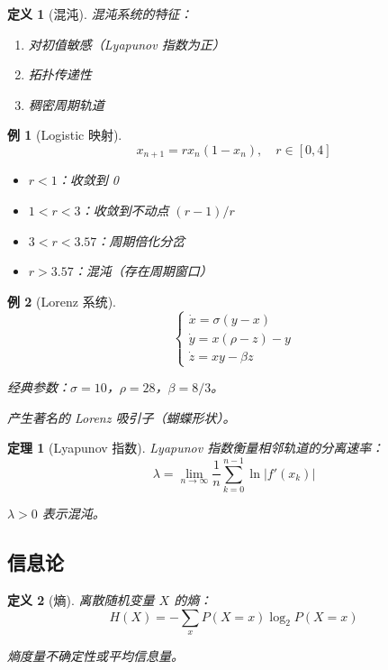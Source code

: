 \documentclass[12pt]{article}
\newtheorem{theorem}{定理}[section]
\newtheorem{definition}{定义}[section]
\newtheorem{example}{例}[section]
\begin{document}
\begin{definition}[混沌]
混沌系统的特征：
\begin{enumerate}
\item 对初值敏感（Lyapunov 指数为正）
\item 拓扑传递性
\item 稠密周期轨道
\end{enumerate}
\end{definition}

\begin{example}[Logistic 映射]
$$x_{n+1} = rx_n(1 - x_n), \quad r \in [0, 4]$$

\begin{itemize}
\item $r < 1$：收敛到 0
\item $1 < r < 3$：收敛到不动点 $(r-1)/r$
\item $3 < r < 3.57$：周期倍化分岔
\item $r > 3.57$：混沌（存在周期窗口）
\end{itemize}
\end{example}

\begin{example}[Lorenz 系统]
$$\begin{cases}
\dot{x} = \sigma(y - x) \\
\dot{y} = x(\rho - z) - y \\
\dot{z} = xy - \beta z
\end{cases}$$

经典参数：$\sigma = 10$，$\rho = 28$，$\beta = 8/3$。

产生著名的 Lorenz 吸引子（蝴蝶形状）。
\end{example}

\begin{theorem}[Lyapunov 指数]
Lyapunov 指数衡量相邻轨道的分离速率：
$$\lambda = \lim_{n \to \infty} \frac{1}{n} \sum_{k=0}^{n-1} \ln|f'(x_k)|$$

$\lambda > 0$ 表示混沌。
\end{theorem}

\subsection{信息论}

\begin{definition}[熵]
离散随机变量 $X$ 的熵：
$$H(X) = -\sum_{x} P(X = x) \log_2 P(X = x)$$

熵度量不确定性或平均信息量。
\end{definition}
\end{document}
